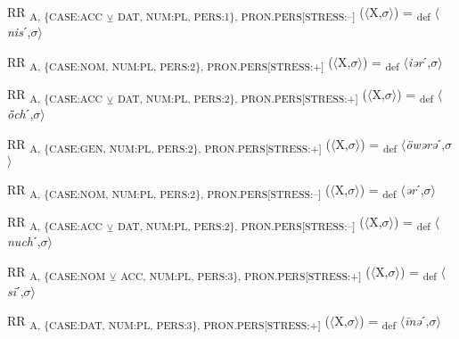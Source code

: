 {\begin{exe}
 RR \textsubscript{A, \{CASE:ACC} \textsubscript{${\veebar}$}\textsubscript{ DAT, NUM:PL, PERS:1\}, PRON.PERS[STRESS:–]} ($\langle$X,$\sigma $$\rangle$) = \textsubscript{def} $\langle$\textit{nis}ˊ,$\sigma $$\rangle$
\end{exe}

\begin{exe}
 RR \textsubscript{A, \{CASE:NOM, NUM:PL, PERS:2\}, PRON.PERS[STRESS:+]} ($\langle$X,$\sigma $$\rangle$) = \textsubscript{def} $\langle$\textit{iər}ˊ,$\sigma $$\rangle$
\end{exe}

\begin{exe}
 RR \textsubscript{A, \{CASE:ACC} \textsubscript{${\veebar}$}\textsubscript{ DAT, NUM:PL, PERS:2\}, PRON.PERS[STRESS:+]} ($\langle$X,$\sigma $$\rangle$) = \textsubscript{def} $\langle$\textit{ȫch}ˊ,$\sigma $$\rangle$
\end{exe}

\begin{exe}
 RR \textsubscript{A, \{CASE:GEN, NUM:PL, PERS:2\}, PRON.PERS[STRESS:+]} ($\langle$X,$\sigma $$\rangle$) = \textsubscript{def} $\langle$\textit{öwərə}ˊ,$\sigma $$\rangle$
\end{exe}

\begin{exe}
 RR \textsubscript{A, \{CASE:NOM, NUM:PL, PERS:2\}, PRON.PERS[STRESS:–]} ($\langle$X,$\sigma $$\rangle$) = \textsubscript{def} $\langle$\textit{ər}ˊ,$\sigma $$\rangle$
\end{exe}

\begin{exe}
 RR \textsubscript{A, \{CASE:ACC} \textsubscript{${\veebar}$}\textsubscript{ DAT, NUM:PL, PERS:2\}, PRON.PERS[STRESS:–]} ($\langle$X,$\sigma $$\rangle$) = \textsubscript{def} $\langle$\textit{nuch}ˊ,$\sigma $$\rangle$
\end{exe}

\begin{exe}
 RR \textsubscript{A, \{CASE:NOM} \textsubscript{${\veebar}$}\textsubscript{ ACC, NUM:PL, PERS:3\}, PRON.PERS[STRESS:+]} ($\langle$X,$\sigma $$\rangle$) = \textsubscript{def} $\langle$\textit{s\=i}ˊ,$\sigma $$\rangle$
\end{exe}

\begin{exe}
 RR \textsubscript{A, \{CASE:DAT, NUM:PL, PERS:3\}, PRON.PERS[STRESS:+]} ($\langle$X,$\sigma $$\rangle$) = \textsubscript{def} $\langle$\textit{\=inə}ˊ,$\sigma $$\rangle$
\end{exe}

}
